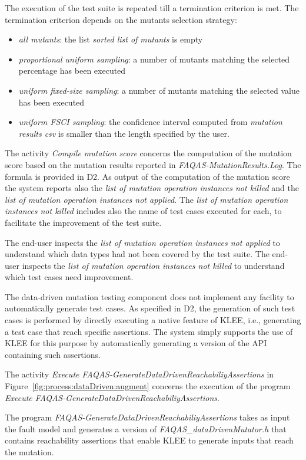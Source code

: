 \RQ{} The execution of the test suite is repeated till a termination criterion is met. The termination criterion depends on the mutants selection strategy:
\begin{itemize}
\item \emph{all mutants}: the list \emph{sorted list of mutants} is empty
\item \emph{proportional uniform sampling}: a number of mutants matching the selected percentage has been executed
\item \emph{uniform fixed-size sampling}: a number of mutants matching the selected value has been executed
\item \emph{uniform FSCI sampling}: the confidence interval computed from \emph{mutation results csv} is smaller than the length specified by the user.
\end{itemize}

\RQ{} The activity \emph{Compile mutation score} concerns the computation of the mutation score based on the mutation results reported in \emph{FAQAS-MutationResults.Log}. The formula is provided in D2. As output of the computation of the mutation score the system reports also the \emph{list of mutation operation instances not killed} and the \emph{list of mutation operation instances not applied}. The \emph{list of mutation operation instances not killed} includes also the name of test cases executed for each, to facilitate the improvement of the test suite.

\RQ{} The end-user inspects the \emph{list of mutation operation instances not applied} to understand which data types had not been covered by the test suite. The end-user inspects the \emph{list of mutation operation instances not killed} to understand which test cases need improvement.

\RQ{} The data-driven mutation testing component does not implement any facility to automatically generate test cases. As specified in D2, the generation of such test cases is performed by directly executing a native feature of KLEE, i.e., generating a test case that reach specific assertions. The system simply supports the use of KLEE for this purpose by automatically generating a version of the API containing such assertions. 

\RQ{} The activity \emph{Execute FAQAS-GenerateDataDrivenReachabiliyAssertions} in Figure~\ref{fig:process:dataDriven:augment} concerns the execution of the program \emph{Execute FAQAS-GenerateDataDrivenReachabiliyAssertions}.

\RQ{} The program \emph{FAQAS-GenerateDataDrivenReachabiliyAssertions} takes as input the fault model and generates a version of \emph{FAQAS\_dataDrivenMutator.h} that contains reachability assertions that enable KLEE to generate inputs that reach the mutation.

